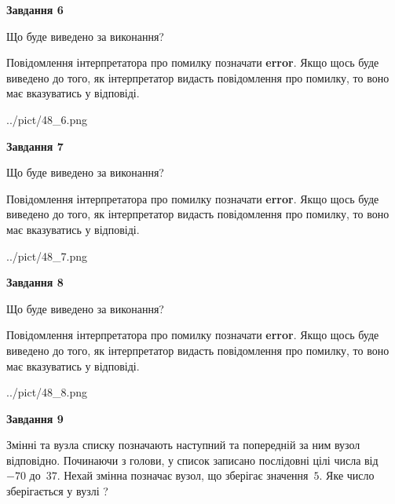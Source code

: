 \documentclass[12pt, ukrainian]{article}
\begin{document}
{\begin {large}
{\begin {center}\textbf{Завдання 6}\end {center}}\par
Що буде виведено за виконання?

Повідомлення інтерпретатора про помилку позначати \textbf{error}.
Якщо щось буде виведено до того, як інтерпретатор видасть повідомлення про помилку, 
то воно має вказуватись у відповіді. \par


\begin{center}
	{../pict/48_6.png}
\end{center}
\newpage

{\begin {center}\textbf{Завдання 7}\end {center}}\par
Що буде виведено за виконання?

Повідомлення інтерпретатора про помилку позначати \textbf{error}.
Якщо щось буде виведено до того, як інтерпретатор видасть повідомлення про помилку, 
то воно має вказуватись у відповіді. \par


\begin{center}
	{../pict/48_7.png}
\end{center}
\newpage

{\begin {center}\textbf{Завдання 8}\end {center}}\par
Що буде виведено за виконання?

Повідомлення інтерпретатора про помилку позначати \textbf{error}.
Якщо щось буде виведено до того, як інтерпретатор видасть повідомлення про помилку, 
то воно має вказуватись у відповіді. \par


\begin{center}
	{../pict/48_8.png}
\end{center}
\newpage

{\begin {center}\textbf{Завдання 9}\end {center}}\par
Змінні  та  вузла списку позначають наступний та попередній за ним вузол відповідно. Починаючи з голови, у список записано послідовні цілі числа від~$-70$ до~$37$. Нехай змінна  позначає вузол, що зберігає значення~$5$.
Яке число зберігається у вузлі  ?\par
\newpage


\end{large}}
\end{document}
